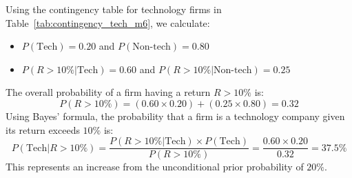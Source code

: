 \begin{tcolorbox}[
	colback=gray!5!white,
	colframe=black!15!white,
	boxrule=0.5pt,
	arc=3pt,
	title=\textbf{Case Study: Technology Companies and Stock Returns},
	coltitle=black,
	colbacktitle=black!5!white,
	before skip=6pt,
	after skip=6pt,
	breakable
]
Using the contingency table for technology firms in Table~\ref{tab:contingency_tech_m6}, we calculate:
\begin{itemize}
	\item $P(\text{Tech}) = 0.20$ and $P(\text{Non-tech}) = 0.80$
	\item $P(R > 10\% | \text{Tech}) = 0.60$ and $P(R > 10\% | \text{Non-tech}) = 0.25$
\end{itemize}
The overall probability of a firm having a return $R > 10\%$ is:
\[ P(R > 10\%) = (0.60 \times 0.20) + (0.25 \times 0.80) = 0.32 \]
Using Bayes' formula, the probability that a firm is a technology company given its return exceeds $10\%$ is:
\[ P(\text{Tech} | R > 10\%) = \frac{P(R > 10\% | \text{Tech}) \times P(\text{Tech})}{P(R > 10\%)} = \frac{0.60 \times 0.20}{0.32} = 37.5\% \]
This represents an increase from the unconditional prior probability of $20\%$.
\end{tcolorbox}

